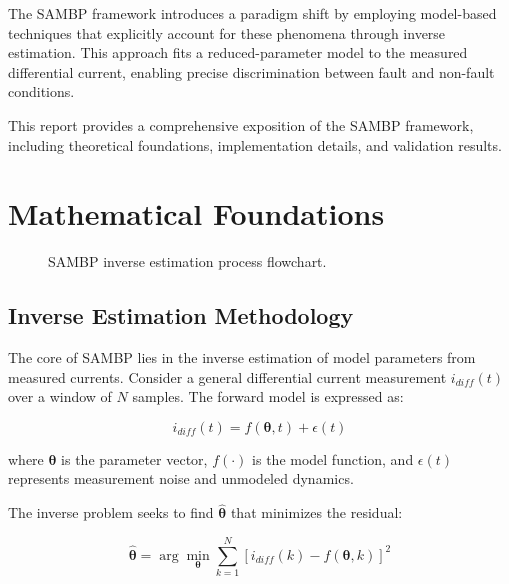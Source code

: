 \documentclass[12pt,a4paper]{article}
\begin{document}
The SAMBP framework introduces a paradigm shift by employing model-based techniques that explicitly account for these phenomena through inverse estimation. This approach fits a reduced-parameter model to the measured differential current, enabling precise discrimination between fault and non-fault conditions.

This report provides a comprehensive exposition of the SAMBP framework, including theoretical foundations, implementation details, and validation results.

\section{Mathematical Foundations}
\label{sec:math}

\begin{figure}[H]
\centering

\caption{SAMBP inverse estimation process flowchart.}
\label{fig:inverse_process}
\end{figure}

\subsection{Inverse Estimation Methodology}
\label{subsec:inverse}

The core of SAMBP lies in the inverse estimation of model parameters from measured currents. Consider a general differential current measurement $i_{diff}(t)$ over a window of $N$ samples. The forward model is expressed as:

\begin{equation}
i_{diff}(t) = f(\boldsymbol{\theta}, t) + \epsilon(t)
\label{eq:forward}
\end{equation}

where $\boldsymbol{\theta}$ is the parameter vector, $f(\cdot)$ is the model function, and $\epsilon(t)$ represents measurement noise and unmodeled dynamics.

The inverse problem seeks to find $\hat{\boldsymbol{\theta}}$ that minimizes the residual:

\begin{equation}
\hat{\boldsymbol{\theta}} = \arg\min_{\boldsymbol{\theta}} \sum_{k=1}^N \left[ i_{diff}(k) - f(\boldsymbol{\theta}, k) \right]^2
\label{eq:inverse}
\end{equation}
\end{document}
